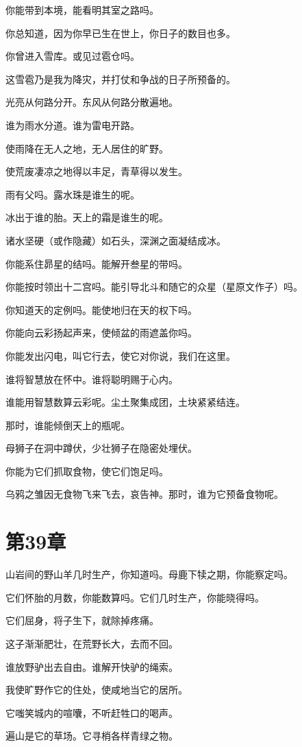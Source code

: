 \documentclass[12pt,oneside]{book}
\begin{document}
你能带到本境，能看明其室之路吗。

你总知道，因为你早已生在世上，你日子的数目也多。

你曾进入雪库。或见过雹仓吗。

这雪雹乃是我为降灾，并打仗和争战的日子所预备的。

光亮从何路分开。东风从何路分散遍地。

谁为雨水分道。谁为雷电开路。

使雨降在无人之地，无人居住的旷野。

使荒废凄凉之地得以丰足，青草得以发生。

雨有父吗。露水珠是谁生的呢。

冰出于谁的胎。天上的霜是谁生的呢。

诸水坚硬（或作隐藏）如石头，深渊之面凝结成冰。

你能系住昴星的结吗。能解开叁星的带吗。

你能按时领出十二宫吗。能引导北斗和随它的众星（星原文作子）吗。

你知道天的定例吗。能使地归在天的权下吗。

你能向云彩扬起声来，使倾盆的雨遮盖你吗。

你能发出闪电，叫它行去，使它对你说，我们在这里。

谁将智慧放在怀中。谁将聪明赐于心内。

谁能用智慧数算云彩呢。尘土聚集成团，土块紧紧结连。

那时，谁能倾倒天上的瓶呢。

母狮子在洞中蹲伏，少壮狮子在隐密处埋伏。

你能为它们抓取食物，使它们饱足吗。

乌鸦之雏因无食物飞来飞去，哀告神。那时，谁为它预备食物呢。


\chapter{第39章}
山岩间的野山羊几时生产，你知道吗。母鹿下犊之期，你能察定吗。

它们怀胎的月数，你能数算吗。它们几时生产，你能晓得吗。

它们屈身，将子生下，就除掉疼痛。

这子渐渐肥壮，在荒野长大，去而不回。

谁放野驴出去自由。谁解开快驴的绳索。

我使旷野作它的住处，使咸地当它的居所。

它嗤笑城内的喧囔，不听赶牲口的喝声。

遍山是它的草场。它寻梢各样青绿之物。
\end{document}
